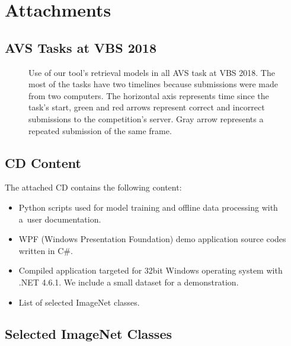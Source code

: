\chapter{Attachments}

\section{AVS Tasks at VBS 2018}\label{att:vbs_tasks_timeline_avs}

\begin{figure}[h]
	\centering
	
	
	\caption[Use of tool's retrieval models in AVS tasks]{Use of our tool's retrieval models in all AVS task at VBS 2018. The most of the tasks have two timelines because submissions were made from two computers. The horizontal axis represents time since the task's start, green and red arrows represent correct and incorrect submissions to the competition's server. Gray arrow represents a repeated submission of the same frame.}
	\label{fig:vbs_tasks_timeline_avs}
\end{figure}

\section{CD Content}\label{att:cd}
The attached CD contains the following content:
\begin{itemize}
	\item Python scripts used for model training and offline data processing with a~user documentation.
	\item WPF (Windows Presentation Foundation) demo application source codes written in C\#.
	\item Compiled application targeted for 32bit Windows operating system with .NET 4.6.1. We include a small dataset for a demonstration.
	\item List of selected ImageNet classes.
\end{itemize}
\clearpage
\section{Selected ImageNet Classes}\label{att:classes}
\noindent\begin{multicols}{9}
{\scriptsize }
\end{multicols}